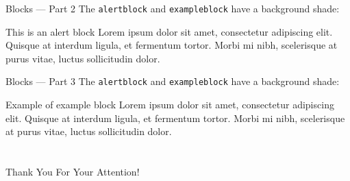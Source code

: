 \documentclass[17pt,aspectratio=169]{beamer}
\begin{document}
\begin{frame}{Blocks --- Part 2}
  The \texttt{alertblock} and \texttt{exampleblock} have a background shade:
  \begin{alertblock}{This is an alert block}
    Lorem ipsum dolor sit amet, consectetur adipiscing elit. Quisque at interdum
    ligula, et fermentum tortor. Morbi mi nibh, scelerisque at purus vitae,
    luctus sollicitudin dolor.
  \end{alertblock}
\end{frame}

\begin{frame}{Blocks --- Part 3}
  The \texttt{alertblock} and \texttt{exampleblock} have a background shade:
  \begin{exampleblock}{Example of example block}
    Lorem ipsum dolor sit amet, consectetur adipiscing elit. Quisque at interdum
    ligula, et fermentum tortor. Morbi mi nibh, scelerisque at purus vitae,
    luctus sollicitudin dolor.
  \end{exampleblock}
\end{frame}

\part{} %
\begin{frame}
  \begin{center}
    \LARGE Thank You For Your Attention!
  \end{center}
\end{frame}
\end{document}
